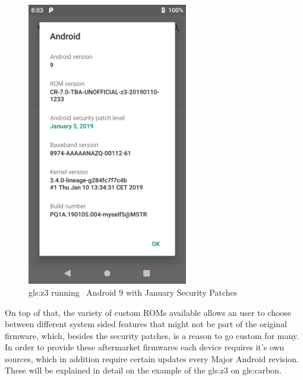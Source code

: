 \begin{figure}
\centering
\includegraphics[width=7cm]{images/z3_january_asb}
\caption{\gls{gls:z3} running ~Android 9 with January Security Patches}
\label{fig:z3_january_asb}
\end{figure}

On top of that, the variety of custom ROMs available allows an user to choose between different system sided features that might not be part of the original firmware, which, besides the security patches, is a reason to go custom for many.
In order to provide these aftermarket firmwares each device requires it's own sources, which in addition require certain updates every Major Android revision. These will be explained in detail on the example of the \gls{gls:z3} on \gls{gls:carbon}.
